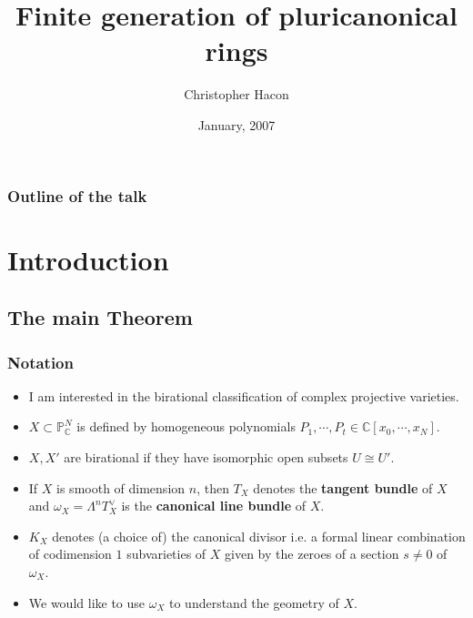 \documentclass{beamer}
\title[Finite generation of pluricanonical rings]{Finite generation of pluricanonical rings}
\author{Christopher Hacon}
\institute{University of Utah}
\date{January, 2007}
\theoremstyle{plain}
\theoremstyle{definition}
\theoremstyle{remark}
\begin{document}
\begin{frame}
  \titlepage
\end{frame}



\begin{frame}
  \frametitle{Outline of the talk}
\end{frame}


\section{Introduction}


\subsection{The main Theorem}
\begin{frame}
  \frametitle{Notation}
\begin{itemize}
\item I am interested in the birational classification of complex projective
varieties.
\pause
\item $X\subset \mathbb{P}_{\mathbb{C}}^N$ is defined by homogeneous
polynomials $P_1,\cdots , P_t\in \mathbb{C}[x_0,\cdots ,x_N]$.
\pause
\item $X,X'$ are birational if they have isomorphic open subsets $U\cong U'$.
\pause
\item If $X$ is smooth of dimension $n$, then $T_X$ denotes the {\bf tangent bundle} of $X$ and $\omega _X=\Lambda ^nT_X^\vee$ is the {\bf canonical line bundle} of $X$.
\pause
\item $K_X$ denotes (a choice of) the canonical divisor i.e. a formal linear combination of codimension $1$ subvarieties of $X$ given by the zeroes of
a section $s\ne 0$ of $\omega _X$.
\pause
\item We would like to use $\omega _X$ to understand the geometry of $X$.
\end{itemize}

\end{frame}
\end{document}
